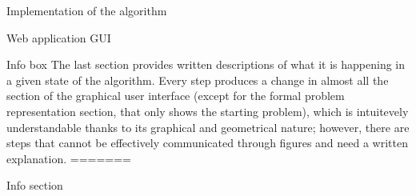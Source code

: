 \documentclass[9pt]{extarticle}
\begin{document}
\begin{section}{Implementation of the algorithm}
\begin{subsection}{Web application GUI}
            \begin{subsubsection}{Info box}
                The last section provides written descriptions of what it is happening in a given state of the algorithm.
                Every step produces a change in almost all the section of the graphical user interface (except for the formal problem representation 
                section, that only shows the starting problem), which is intuitevely understandable thanks to its graphical and geometrical nature; 
                however, there are steps that cannot be effectively communicated through figures and need a written explanation.
=======


            \end{subsubsection}

            \begin{subsubsection}{Info section}
                

\end{subsubsection}
\end{subsection}
\end{section}
\end{document}
